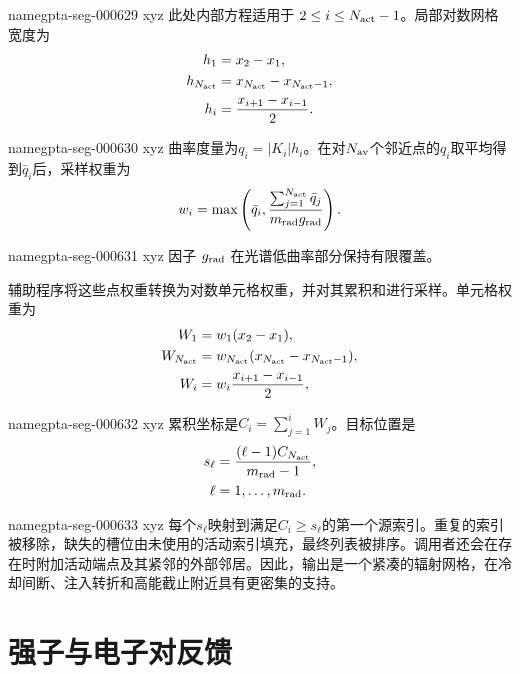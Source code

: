\documentclass[twocolumn]{aastex702}
\makeatletter
\providecommand{\gptareaderanchor}[1]{\pdfdest name{#1} xyz}%
\providecommand{\gptareaderanchor}[1]{\special{pdf:dest (#1) [ @thispage /XYZ @xpos @ypos null ]}}%
\makeatother
\begin{document}
\gptareaderanchor{gpta-seg-000629}%
此处内部方程适用于 \(2\le i\le N_{\rm act}-1\)。局部对数网格宽度为
\begin{equation}
\begin{aligned}
h_1&=x_2-x_1,\\
h_{N_{\rm act}}&=x_{N_{\rm act}}-x_{N_{\rm act}-1},\\
h_i&=\frac{x_{i+1}-x_{i-1}}{2}.
\end{aligned}
\end{equation}

\gptareaderanchor{gpta-seg-000630}%
曲率度量为\(q_i=|K_i|h_i\)。在对\(N_{\rm av}\)个邻近点的\(q_i\)取平均得到\(\bar q_i\)后，采样权重为
\begin{equation}
w_i=\max\left(\bar q_i,\frac{\sum_{j=1}^{N_{\rm act}}\bar q_j}
{m_{\rm rad}g_{\rm rad}}\right).
\end{equation}

\gptareaderanchor{gpta-seg-000631}%
因子 \(g_{\rm rad}\) 在光谱低曲率部分保持有限覆盖。

辅助程序将这些点权重转换为对数单元格权重，并对其累积和进行采样。单元格权重为
\begin{equation}
\begin{aligned}
W_1&=w_1(x_2-x_1),\\
W_{N_{\rm act}}&=w_{N_{\rm act}}(x_{N_{\rm act}}-x_{N_{\rm act}-1}),\\
W_i&=w_i\frac{x_{i+1}-x_{i-1}}{2},
\end{aligned}
\end{equation}

\gptareaderanchor{gpta-seg-000632}%
累积坐标是\(C_i=\sum_{j=1}^i W_j\)。目标位置是
\begin{equation}
\begin{aligned}
s_\ell&=\frac{(\ell-1)C_{N_{\rm act}}}{m_{\rm rad}-1},\\
\ell&=1,\ldots,m_{\rm rad}.
\end{aligned}
\end{equation}

\gptareaderanchor{gpta-seg-000633}%
每个\(s_\ell\)映射到满足\(C_i\ge s_\ell\)的第一个源索引。重复的索引被移除，缺失的槽位由未使用的活动索引填充，最终列表被排序。调用者还会在存在时附加活动端点及其紧邻的外部邻居。因此，输出是一个紧凑的辐射网格，在冷却间断、注入转折和高能截止附近具有更密集的支持。

\section{强子与电子对反馈} \label{app:hadronic-pair-feedback}\label{app:hadronic-figure}
\end{document}
